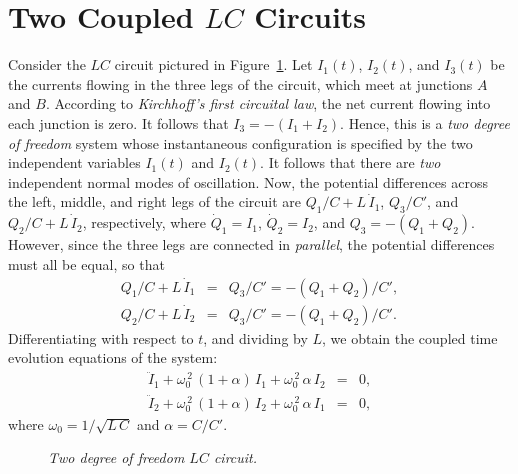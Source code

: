 {\section{Two Coupled $LC$ Circuits}
Consider the $LC$ circuit pictured in Figure~\ref{f4.3}. Let $I_1(t)$, $I_2(t)$,
and $I_3(t)$ be the currents flowing in the three legs of the circuit, which meet
at junctions $A$ and $B$.
 According to
{\em Kirchhoff's first circuital law}, the net current flowing into
each junction  is zero. It follows that $I_3=-(I_1+I_2)$. Hence, this
is a {\em two degree of freedom}\/ system whose instantaneous configuration is
specified by the two independent variables $I_1(t)$ and $I_2(t)$. It follows that there
are {\em two}\/ independent normal modes of oscillation. 
Now, the potential differences across the left, middle, and right legs of the circuit  are $Q_1/C+L\,\dot{I}_1$, $Q_3/C'$, and $Q_2/C+L\,\dot{I}_2$,
respectively, where $\dot{Q}_1=I_1$, $\dot{Q}_2=I_2$, and $Q_3=-(Q_1+Q_2)$. 
However, since the
three legs are connected in {\em parallel},  the potential differences must
all be equal, so that
\begin{eqnarray}
Q_1/C + L\,\dot{I}_1 &=& Q_3/C' = -(Q_1+Q_2)/C',\\[0.5ex]
Q_2/C+L\,\dot{I}_2 &=& Q_3/C' = -(Q_1+Q_2)/C'.
\end{eqnarray}
Differentiating with respect to $t$, and dividing by $L$,  we obtain the coupled time evolution
equations of the system:
\begin{eqnarray}\label{e4.36}
\ddot{I}_1 + \omega_0^{\,2}\,(1+\alpha)\,I_1+\omega_0^{\,2}\, \alpha\,I_2&=&0,\\[0.5ex]
\ddot{I}_2 + \omega_0^{\,2}\,(1+\alpha)\,I_2+ \omega_0^{\,2}\,\alpha\,I_1&=&0,\label{e4.37}
\end{eqnarray}
where $\omega_0=1/\sqrt{L\,C}$ and $\alpha=C/C'$. 

\begin{figure}
\centerline{}
\caption{\em Two degree of freedom $LC$ circuit.}\label{f4.3}   
\end{figure}

}
